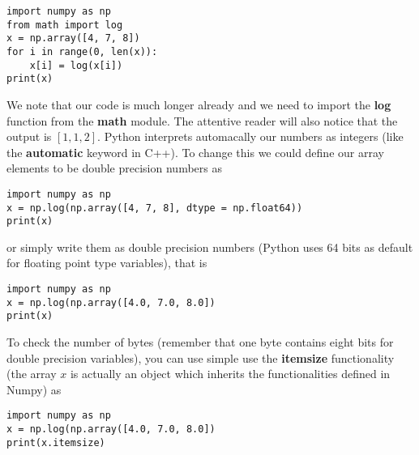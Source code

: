 \documentclass[%
oneside,                 %
final,                   %
10pt]{article}
\begin{document}
\begin{verbatim}
import numpy as np
from math import log
x = np.array([4, 7, 8])
for i in range(0, len(x)):
    x[i] = log(x[i])
print(x)
\end{verbatim}
We note that our code is much longer already and we need to import the \textbf{log} function from the \textbf{math} module. 
The attentive reader will also notice that the output is $[1, 1, 2]$. Python interprets automacally our numbers as integers (like the \textbf{automatic} keyword in C++). To change this we could define our array elements to be double precision numbers as
\begin{verbatim}
import numpy as np
x = np.log(np.array([4, 7, 8], dtype = np.float64))
print(x)
\end{verbatim}
or simply write them as double precision numbers (Python uses 64 bits as default for floating point type variables), that is
\begin{verbatim}
import numpy as np
x = np.log(np.array([4.0, 7.0, 8.0])
print(x)
\end{verbatim}
To check the number of bytes (remember that one byte contains eight bits for double precision variables), you can use simple use the \textbf{itemsize} functionality (the array $x$ is actually an object which inherits the functionalities defined in Numpy) as 
\begin{verbatim}
import numpy as np
x = np.log(np.array([4.0, 7.0, 8.0])
print(x.itemsize)
\end{verbatim}
\end{document}
